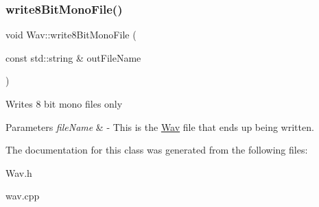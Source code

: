 \subsubsection{\texorpdfstring{write8\+Bit\+Mono\+File()}{write8BitMonoFile()}}
{\footnotesize\ttfamily void Wav\+::write8\+Bit\+Mono\+File (\begin{DoxyParamCaption}\item[{const std\+::string \&}]{out\+File\+Name }\end{DoxyParamCaption})}

Writes 8 bit mono files only 
\begin{DoxyParams}{Parameters}
{\em file\+Name} & -\/ This is the \hyperlink{classWav}{Wav} file that ends up being written. \\
\hline
\end{DoxyParams}


The documentation for this class was generated from the following files\+:\begin{DoxyCompactItemize}
\item 
Wav.\+h\item 
wav.\+cpp\end{DoxyCompactItemize}
